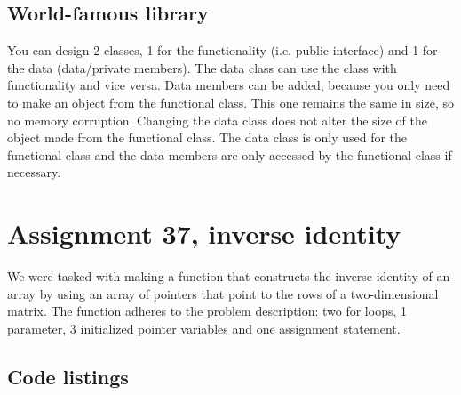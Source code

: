 \documentclass[11pt]{article}
\begin{document}
\subsection*{World-famous library}
You can design 2 classes, 1 for the functionality (i.e. public interface) and 1 for the data (data/private members). The data class can use the class with functionality and vice versa. Data members can be added, because you only need to make an object from the functional class. This one remains the same in size, so no memory corruption. Changing the data class does not alter the size of the object made from the functional class. The data class is only used for the functional class and the data members are only accessed by the functional class if necessary.

\section*{Assignment 37, inverse identity}
We were tasked with making a function that constructs the inverse identity of an array by using an array of pointers that point to the rows of a two-dimensional matrix. The function adheres to the problem description: two for loops, 1 parameter, 3 initialized pointer variables and one assignment statement.

\subsection*{Code listings}



\end{document}
